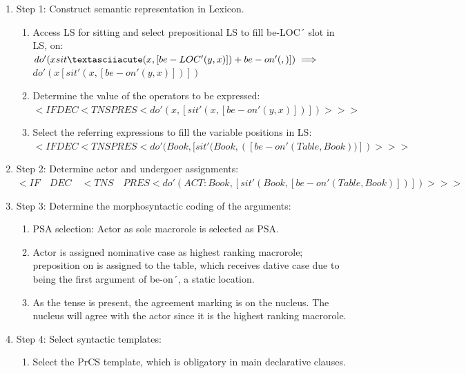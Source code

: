 \begin{enumerate}
    \item Step 1: Construct semantic representation in Lexicon.
    \begin{enumerate}
        \item Access LS for sitting and select prepositional LS to fill be-LOC´ slot in LS, on: \\
        $do' (x sit´ (x, [be-LOC' (y, x)]) + be-on' ( , )]) \\ \implies$
        $do' (x [sit' (x, [be-on' (y, x)])])$
        \item Determine the value of the operators to be expressed:\\
        $<IF DEC <TNS PRES < do' (x, [sit' (x, [be-on' (y, x)])])>>>$
        \item Select the referring expressions to fill the variable positions in LS: \\
        $<IF DEC <TNS PRES < do' (Book, [sit' (Book, ([be-on' (Table, Book))])>>>$
    \end{enumerate}
    \item Step 2: Determine actor and undergoer assignments:\\
    $<IF \hspace{1em} DEC \hspace{1em} <TNS \hspace{1em} PRES < do' (ACT: Book, [sit' (Book, [be-on' (Table, Book)])])>>>$
\item Step 3: Determine the morphosyntactic coding of the arguments:
     \begin{enumerate}
         \item PSA selection: Actor as sole macrorole is selected as PSA.
          \item Actor is assigned nominative case as highest ranking macrorole; 
                preposition on is assigned to the table, which receives dative case due to being the first argument of be-on´, a static location.
          \item As the tense is present, the agreement marking is on the nucleus. The nucleus will agree with the actor since it is the highest ranking macrorole.
     \end{enumerate}
\item Step 4: Select syntactic templates:\\
    \begin{enumerate}
         \item Select the PrCS template, which is obligatory in main declarative clauses.

\end{enumerate}
\end{enumerate}
